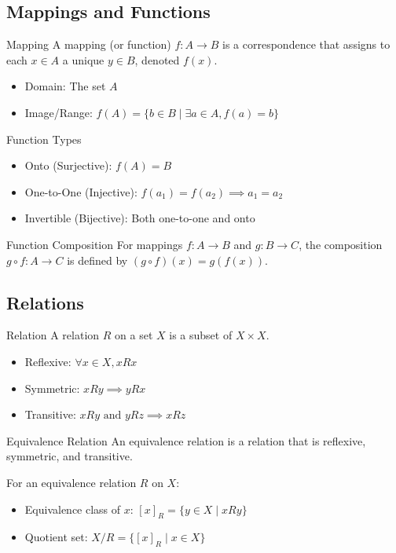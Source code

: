 \subsection{Mappings and Functions}

\begin{definitionbox}{Mapping}
A mapping (or function) $f: A \to B$ is a correspondence that assigns to each $x \in A$ a unique $y \in B$, denoted $f(x)$.
\begin{itemize}
    \item Domain: The set $A$
    \item Image/Range: $f(A) = \{b \in B \mid \exists a \in A, f(a) = b\}$
\end{itemize}
\end{definitionbox}

\begin{definitionbox}{Function Types}
\begin{itemize}
    \item Onto (Surjective): $f(A) = B$
    \item One-to-One (Injective): $f(a_1) = f(a_2) \implies a_1 = a_2$
    \item Invertible (Bijective): Both one-to-one and onto
\end{itemize}
\end{definitionbox}

\begin{definitionbox}{Function Composition}
For mappings $f: A \to B$ and $g: B \to C$, the composition $g \circ f: A \to C$ is defined by $(g \circ f)(x) = g(f(x))$.
\end{definitionbox}

\subsection{Relations}

\begin{definitionbox}{Relation}
A relation $R$ on a set $X$ is a subset of $X \times X$. 
\begin{itemize}
    \item Reflexive: $\forall x \in X, xRx$
    \item Symmetric: $x R y \implies y R x$
    \item Transitive: $x R y \text{ and } y R z \implies x R z$
\end{itemize}
\end{definitionbox}

\begin{definitionbox}{Equivalence Relation}
An equivalence relation is a relation that is reflexive, symmetric, and transitive.

For an equivalence relation $R$ on $X$:
\begin{itemize}
    \item Equivalence class of $x$: $[x]_R = \{y \in X \mid xRy\}$
    \item Quotient set: $X/R = \{[x]_R \mid x \in X\}$
\end{itemize}
\end{definitionbox}

